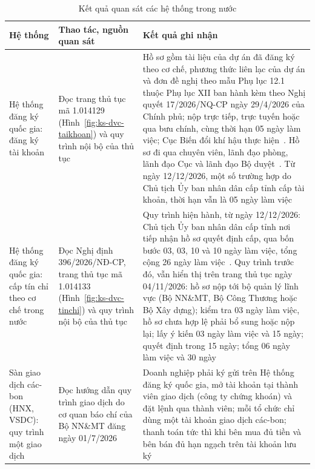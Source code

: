 \begin{table}[htbp]
    \centering
    \caption{Kết quả quan sát các hệ thống trong nước}
    \label{tab:ks-quansat}
    \small
    \renewcommand{\arraystretch}{1.2}
    \begin{tabularx}{\textwidth}{|>{\raggedright\arraybackslash}p{2.6cm}|>{\raggedright\arraybackslash}p{3.4cm}|X|}
        \hline
        \textbf{Hệ thống} & \textbf{Thao tác, nguồn quan sát} & \textbf{Kết quả ghi nhận} \\
        \hline
        Hệ thống đăng ký quốc gia: đăng ký tài khoản & Đọc trang thủ tục mã 1.014129 (Hình~\ref{fig:ks-dvc-taikhoan}) và quy trình nội bộ của thủ tục & Hồ sơ gồm tài liệu của dự án đã đăng ký theo cơ chế, phương thức liên lạc của dự án và đơn đề nghị theo mẫu Phụ lục 12.1 thuộc Phụ lục XII ban hành kèm theo Nghị quyết 17/2026/NQ-CP ngày 29/4/2026 của Chính phủ; nộp trực tiếp, trực tuyến hoặc qua bưu chính, cùng thời hạn 05 ngày làm việc; Cục Biến đổi khí hậu thực hiện~\cite{mae2026tthc1014129}. Hồ sơ đi qua chuyên viên, lãnh đạo phòng, lãnh đạo Cục và lãnh đạo Bộ duyệt~\cite{mae2025qd2935}. Từ ngày 12/12/2026, một số trường hợp do Chủ tịch Ủy ban nhân dân cấp tỉnh cấp tài khoản, thời hạn vẫn là 05 ngày làm việc~\cite{vietnam2026nghidinh396} \\
        \hline
        Hệ thống đăng ký quốc gia: cấp tín chỉ theo cơ chế trong nước & Đọc Nghị định 396/2026/NĐ-CP, trang thủ tục mã 1.014133 (Hình~\ref{fig:ks-dvc-tinchi}) và quy trình nội bộ của thủ tục & Quy trình hiện hành, từ ngày 12/12/2026: Chủ tịch Ủy ban nhân dân cấp tỉnh nơi tiếp nhận hồ sơ quyết định cấp, qua bốn bước 03, 03, 10 và 10 ngày làm việc, tổng cộng 26 ngày làm việc~\cite{vietnam2026nghidinh396}. Quy trình trước đó, vẫn hiển thị trên trang thủ tục ngày 04/11/2026: hồ sơ nộp tới bộ quản lý lĩnh vực (Bộ NN\&MT, Bộ Công Thương hoặc Bộ Xây dựng); kiểm tra 03 ngày làm việc, hồ sơ chưa hợp lệ phải bổ sung hoặc nộp lại; lấy ý kiến 03 ngày làm việc và 15 ngày; quyết định trong 15 ngày; tổng 06 ngày làm việc và 30 ngày~\cite{mae2026tthc1014133} \cite{mae2025qd2935} \\
        \hline
        Sàn giao dịch các-bon (HNX, VSDC): quy trình một giao dịch & Đọc hướng dẫn quy trình giao dịch do cơ quan báo chí của Bộ NN\&MT đăng ngày 01/7/2026 & Doanh nghiệp phải ký gửi trên Hệ thống đăng ký quốc gia, mở tài khoản tại thành viên giao dịch (công ty chứng khoán) và đặt lệnh qua thành viên; mỗi tổ chức chỉ dùng một tài khoản giao dịch các-bon; thanh toán tức thì khi bên mua đủ tiền và bên bán đủ hạn ngạch trên tài khoản lưu ký~\cite{nnmt2026quytrinh} \\

\end{tabularx}
\end{table}
